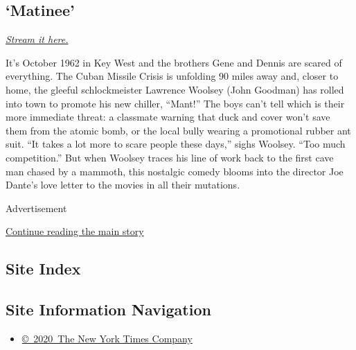 \hypertarget{matinee}{%
\subsection{`Matinee'}\label{matinee}}

\href{https://www.peacocktv.com/watch/asset/movies/comedy/matinee/27ce4010-3b5f-3a8c-822b-1783265919be}{\emph{Stream
it here.}}

It's October 1962 in Key West and the brothers Gene and Dennis are
scared of everything. The Cuban Missile Crisis is unfolding 90 miles
away and, closer to home, the gleeful schlockmeister Lawrence Woolsey
(John Goodman) has rolled into town to promote his new chiller,
``Mant!'' The boys can't tell which is their more immediate threat: a
classmate warning that duck and cover won't save them from the atomic
bomb, or the local bully wearing a promotional rubber ant suit. ``It
takes a lot more to scare people these days,'' sighs Woolsey. ``Too much
competition.'' But when Woolsey traces his line of work back to the
first cave man chased by a mammoth, this nostalgic comedy blooms into
the director Joe Dante's love letter to the movies in all their
mutations.

Advertisement

\protect\hyperlink{after-bottom}{Continue reading the main story}

\hypertarget{site-index}{%
\subsection{Site Index}\label{site-index}}

\hypertarget{site-information-navigation}{%
\subsection{Site Information
Navigation}\label{site-information-navigation}}

\begin{itemize}
\tightlist
\item
  \href{https://help.nytimes.com/hc/en-us/articles/115014792127-Copyright-notice}{©~2020~The
  New York Times Company}
\end{itemize}

